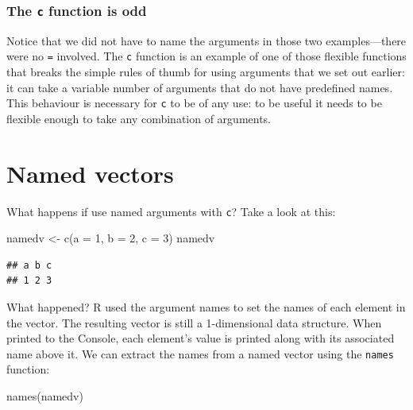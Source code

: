 \documentclass[
]{book}
\newenvironment{Shaded}{\begin{snugshade}}{\end{snugshade}}
\newcommand{\AttributeTok}[1]{\textcolor[rgb]{0.77,0.63,0.00}{#1}}
\newcommand{\DecValTok}[1]{\textcolor[rgb]{0.00,0.00,0.81}{#1}}
\newcommand{\FunctionTok}[1]{\textcolor[rgb]{0.00,0.00,0.00}{#1}}
\newcommand{\NormalTok}[1]{#1}
\newcommand{\OtherTok}[1]{\textcolor[rgb]{0.56,0.35,0.01}{#1}}
\newenvironment{greybox}{
  \definecolor{shadecolor}{rgb}{0.95,0.95,0.95}  %
  \color{black}
  \begin{shaded}}
 {\end{shaded}}
\newenvironment{infobox}[1]
  {
  \begin{itemize}
  \renewcommand{\labelitemi}{
    \raisebox{-.7\height}[0pt][0pt]{
      {\setkeys{Gin}{width=3em,keepaspectratio}
        \texttt{[image: images/\#1]}}
    }
  }
  \setlength{\fboxsep}{1em}
  \begin{greybox}
  \item
  }
  {
  \end{greybox}
  \end{itemize}
  }
\begin{document}
\begin{infobox}{information}

\hypertarget{the-c-function-is-odd}{%
\subsubsection*{\texorpdfstring{The \texttt{c} function is odd}{The c function is odd}}\label{the-c-function-is-odd}}

Notice that we did not have to name the arguments in those two examples---there were no \texttt{=} involved. The \texttt{c} function is an example of one of those flexible functions that breaks the simple rules of thumb for using arguments that we set out earlier: it can take a variable number of arguments that do not have predefined names. This behaviour is necessary for \texttt{c} to be of any use: to be useful it needs to be flexible enough to take any combination of arguments.

\end{infobox}

\hypertarget{named-vectors}{%
\section{Named vectors}\label{named-vectors}}

What happens if use named arguments with \texttt{c}? Take a look at this:

\begin{Shaded}
\begin{Highlighting}[]
\NormalTok{namedv }\OtherTok{\textless{}{-}} \FunctionTok{c}\NormalTok{(}\AttributeTok{a =} \DecValTok{1}\NormalTok{, }\AttributeTok{b =} \DecValTok{2}\NormalTok{, }\AttributeTok{c =} \DecValTok{3}\NormalTok{)}
\NormalTok{namedv}
\end{Highlighting}
\end{Shaded}

\begin{verbatim}
## a b c 
## 1 2 3
\end{verbatim}

What happened? R used the argument names to set the names of each element in the vector. The resulting vector is still a 1-dimensional data structure. When printed to the Console, each element's value is printed along with its associated name above it. We can extract the names from a named vector using the \texttt{names} function:

\begin{Shaded}
\begin{Highlighting}[]
\FunctionTok{names}\NormalTok{(namedv)}
\end{Highlighting}
\end{Shaded}
\end{document}
